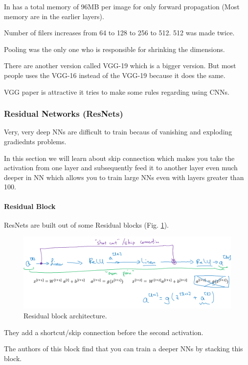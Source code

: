 In has a total memory of 96MB per image for only forward propagation (Most memory are in the earlier layers).

Number of filers increases from 64 to 128 to 256 to 512. 512 was made twice.

Pooling was the only one who is responsible for shrinking the dimensions.

There are another version called VGG-19 which is a bigger version. But most people uses the VGG-16 instead of the VGG-19 because it does the same.

VGG paper is attractive it tries to make some rules regarding using CNNs.

\subsubsection{Residual Networks (ResNets)}
Very, very deep NNs are difficult to train becaus of vanishing and exploding gradiednts problems.

In this section we will learn about skip connection which makes you take the activation from one layer and subsequently feed it to another layer even much deeper in NN which allows you to train large NNs even with layers greater than 100.

\paragraph{Residual Block}
ResNets are built out of some Residual blocks (Fig. \ref{resblock}).

\begin{figure}[!htbp]
    \centering
    \includegraphics[width=1.0\textwidth]{img/c4/resblock.png}
    \caption{Residual block architecture.}
    \label{resblock}
\end{figure}

They add a shortcut/skip connection before the second activation.

The authors of this block find that you can train a deeper NNs by stacking this block.

